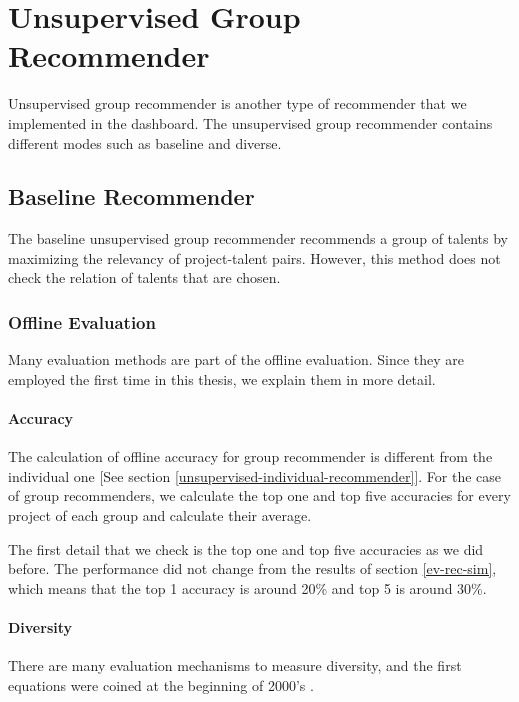 \section{Unsupervised Group Recommender}\label{ev:unsupervised-group-rec}

Unsupervised group recommender is another type of recommender that we implemented in the dashboard. The unsupervised group recommender contains different modes such as baseline and diverse. 


\subsection{Baseline Recommender}

The baseline unsupervised group recommender recommends a group of talents by maximizing the relevancy of project-talent pairs. However, this method does not check the relation of talents that are chosen. 

\subsubsection{Offline Evaluation}

Many evaluation methods are part of the offline evaluation. Since they are employed the first time in this thesis, we explain them in more detail.

\paragraph{Accuracy}

The calculation of offline accuracy for group recommender is different from the individual one [See section \ref{unsupervised-individual-recommender}]. For the case of group recommenders, we calculate the top one and top five accuracies for every project of each group and calculate their average.

The first detail that we check is the top one and top five accuracies as we did before. The performance did not change from the results of section \ref{ev-rec-sim}, which means that the top 1 accuracy is around 20\% and top 5 is around 30\%.

\paragraph{Diversity}\label{ev-unsupervised-group-diversity}

There are many evaluation mechanisms to measure diversity, and the first equations were coined at the beginning of 2000's \cite{smyth2001similarity}.

